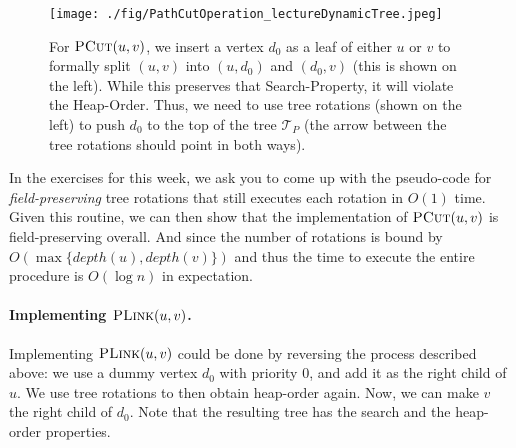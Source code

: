\begin{figure}[!ht]
    \centering
    \texttt{[image: ./fig/PathCutOperation\_lectureDynamicTree.jpeg]}
    \caption{For $\textsc{PCut}(u,v)$, we insert a vertex $d_0$ as a leaf of either $u$ or $v$ to formally split $(u,v)$ into $(u,d_0)$ and $(d_0,v)$ (this is shown on the left). While this preserves that Search-Property, it will violate the Heap-Order. Thus, we need to use tree rotations (shown on the left) to push $d_0$ to the top of the tree $\mathcal{T}_{P}$ (the arrow between the tree rotations should point in both ways).}
    \label{fig:PCutRotation}
\end{figure}

In the exercises for this week, we ask you to come up with the pseudo-code for \emph{field-preserving} tree rotations that still executes each rotation in $O(1)$ time.  Given this routine, we can then show that the implementation of  $\textsc{PCut}(u,v)$ is field-preserving overall. And since the number of rotations is bound by $O(\max\{depth(u), depth(v)\})$ and thus the time to execute the entire procedure is $O(\log n)$ in expectation.



\paragraph{Implementing $\textsc{PLink}(u,v)$.} Implementing $\textsc{PLink}(u,v)$ could be done by reversing the process described above: we use a dummy vertex $d_0$ with priority $0$, and add it as the right child of $u$. We use tree rotations to then obtain heap-order again. Now,  we can make $v$ the right child of $d_0$. Note that the resulting tree has the search and the heap-order properties. 

